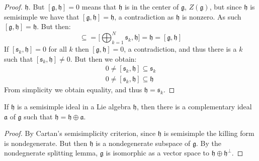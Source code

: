 \documentclass[crop=false,class=article]{standalone}                           %
\begin{document}
\begin{proof}
            $\mathfrak{h}$. But $[\mathfrak{g},\mathfrak{h}]=0$ means that
            $\mathfrak{h}$ is in the center of $\mathfrak{g}$,
            $Z(\mathfrak{g})$, but since $\mathfrak{h}$ is semisimple we have
            that $[\mathfrak{g},\mathfrak{h}]=\mathfrak{h}$, a contradiction as
            $\mathfrak{h}$ is nonzero. As such
            $[\mathfrak{g},\mathfrak{h}]=\mathfrak{h}$. But then:
            \begin{equation}
                [\mathfrak{s}_{k},\mathfrak{h}]\subseteq
                =\Big[\bigoplus_{k=1}^{N}\mathfrak{s}_{k},\mathfrak{h}\Big]
                =\mathfrak{h}=[\mathfrak{g},\mathfrak{h}]
            \end{equation}
            If $[\mathfrak{s}_{k},\mathfrak{h}]=0$ for all $k$ then
            $[\mathfrak{g},\mathfrak{h}]=0$, a contradiction, and thus there
            is a $k$ such that $[\mathfrak{s}_{k},\mathfrak{h}]\ne{0}$. But then
            we obtain:
            \begin{align}
                0\ne[\mathfrak{s}_{k},\mathfrak{h}]\subseteq\mathfrak{s}_{k}\\
                0\ne[\mathfrak{s}_{k},\mathfrak{h}]\subseteq\mathfrak{h}
            \end{align}
            From simplicity we obtain equality, and thus
            $\mathfrak{h}=\mathfrak{s}_{k}$.
        \end{proof}
        \begin{theorem}
            If $\mathfrak{h}$ is a semisimple ideal in a Lie algebra
            $\mathfrak{h}$, then there is a complementary ideal $\mathfrak{a}$
            of $\mathfrak{g}$ such that
            $\mathfrak{h}=\mathfrak{h}\oplus\mathfrak{a}$.
        \end{theorem}
        \begin{proof}
            By Cartan's semisimplicity criterion, since $\mathfrak{h}$ is
            semisimple the killing form is nondegenerate. But then
            $\mathfrak{h}$ is a nondegenerate subspace of $\mathfrak{g}$. By
            the nondegnerate splitting lemma, $\mathfrak{g}$ is isomorphic as
            a vector space to $\mathfrak{h}\oplus\mathfrak{h}^{\perp}$.
        \end{proof}
\end{document}
